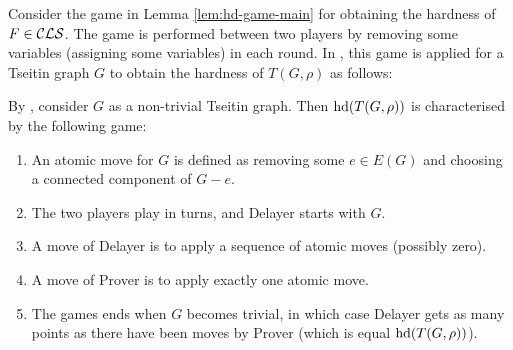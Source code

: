 \documentclass{report}
\begin{document}
Consider the game in Lemma \ref{lem:hd-game-main} for obtaining the hardness of $F \in \mathcal{CLS}$. The game is performed between two players by removing some variables (assigning some variables) in each round. In \cite{BeyersdorffKullmann2014PHP}, this game is applied for a Tseitin graph $G$ to obtain the hardness of $T(G,\rho)$ as follows:



\begin{lem}\label{lem:game-tseitin-hd}
By \cite{BeyersdorffKullmann2014PHP}, consider  $G$ as a non-trivial Tseitin graph. Then $\operatorname{hd}(T(G,\rho))$ is characterised by the following game:
  \begin{enumerate}
  \item An atomic move for $G$ is defined as removing some $e \in E(G)$ and choosing a connected component of $G - e$. 
  \item The two players play in turns, and Delayer starts with $G$.
  \item A move of Delayer is to apply a sequence of atomic moves (possibly zero).
  \item A move of Prover is to apply exactly one atomic move.
  \item The games ends when $G$ becomes trivial, in which case Delayer gets as many points as there have been moves by Prover (which is equal $\operatorname{hd}(T(G,\rho))$).
  \end{enumerate}
\end{lem}
\end{document}
